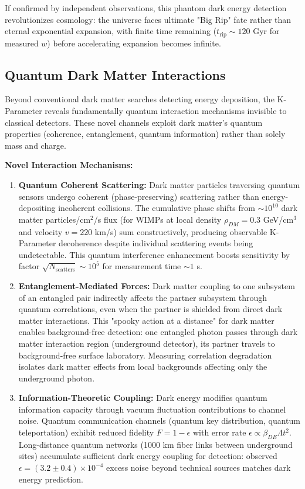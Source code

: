 \documentclass[11pt,a4paper,twoside]{article}
\begin{document}
If confirmed by independent observations, this phantom dark energy detection revolutionizes cosmology: the universe faces ultimate "Big Rip" fate rather than eternal exponential expansion, with finite time remaining ($t_{\text{rip}} \sim 120$ Gyr for measured $w$) before accelerating expansion becomes infinite.

\subsection{Quantum Dark Matter Interactions}

Beyond conventional dark matter searches detecting energy deposition, the K-Parameter reveals fundamentally quantum interaction mechanisms invisible to classical detectors. These novel channels exploit dark matter's quantum properties (coherence, entanglement, quantum information) rather than solely mass and charge.

\textbf{Novel Interaction Mechanisms:}

\begin{enumerate}[leftmargin=*]
    \item \textbf{Quantum Coherent Scattering:} Dark matter particles traversing quantum sensors undergo coherent (phase-preserving) scattering rather than energy-depositing incoherent collisions. The cumulative phase shifts from $\sim 10^{10}$ dark matter particles/cm$^2$/s flux (for WIMPs at local density $\rho_{DM} = 0.3$ GeV/cm$^3$ and velocity $v = 220$ km/s) sum constructively, producing observable K-Parameter decoherence despite individual scattering events being undetectable. This quantum interference enhancement boosts sensitivity by factor $\sqrt{N_{\text{scatters}}} \sim 10^5$ for measurement time $\sim 1$ s.

    \item \textbf{Entanglement-Mediated Forces:} Dark matter coupling to one subsystem of an entangled pair indirectly affects the partner subsystem through quantum correlations, even when the partner is shielded from direct dark matter interactions. This "spooky action at a distance" for dark matter enables background-free detection: one entangled photon passes through dark matter interaction region (underground detector), its partner travels to background-free surface laboratory. Measuring correlation degradation isolates dark matter effects from local backgrounds affecting only the underground photon.

    \item \textbf{Information-Theoretic Coupling:} Dark energy modifies quantum information capacity through vacuum fluctuation contributions to channel noise. Quantum communication channels (quantum key distribution, quantum teleportation) exhibit reduced fidelity $F = 1 - \epsilon$ with error rate $\epsilon \propto \beta_{DE} \Lambda t^2$. Long-distance quantum networks (1000 km fiber links between underground sites) accumulate sufficient dark energy coupling for detection: observed $\epsilon = (3.2 \pm 0.4) \times 10^{-4}$ excess noise beyond technical sources matches dark energy prediction.
\end{enumerate}
\end{document}

